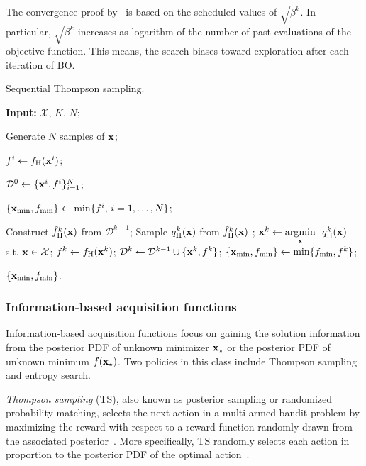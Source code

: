 \documentclass[journal ]{new-aiaa}
\begin{document}
The convergence proof by~\citet{Srinivas2010} is based on the scheduled values of $\sqrt{\beta^k}$.
In particular, $\sqrt{\beta^k}$ increases as logarithm of the number of past evaluations of the objective function.
This means, the search biases toward exploration after each iteration of BO.

\begin{algorithm}
	\caption{Sequential Thompson sampling.}\label{Algo2}
	\begin{algorithmic}[1]
		\State \textbf{Input:} $\mathcal{X}$, $K$, $N$;
		
		\State Generate $N$ samples of ${\bf x}$;
		
		\State $f^i \gets f_\text{H}({\bf x}^i)$; \textcolor{black}{}
		\EndFor
		
		\State $\mathcal{D}^0 \gets \{{\bf x}^i,f^i\}_{i=1}^N$;
		
		\State $\{{\bf x}_{\min},f_{\min}\} \gets \min\{f^i,\, i=1,\dots, N\}$;
		
		\State Construct $\hat{f}_\text{H}^k({\bf x})$ from $\mathcal{D}^{k-1}$;
		\State Sample $q_\text{H}^k({\bf x})$ from $\hat{f}_\text{H}^k({\bf x})$ \label{Algo2:10}; 
		\State ${\bf x}^{k} \gets \underset{{\bf x}}{\mathrm{argmin}} \ \ q_\text{H}^k({\bf x})$ s.t. ${\bf x} \in \mathcal{X}$;
		\State $f^{k} \gets f_\text{H}({\bf x}^{k})$;
		\textcolor{black}{}
		\State $\mathcal{D}^k\gets\mathcal{D}^{k-1} \cup \{{\bf x}^{k},f^{k}\}$;
		\State $\{{\bf x}_{\min},f_{\min}\} \gets \min\{f_{\min},f^{k}\}$;
		\EndFor
		
		\State \Return $\{{\bf x}_{\min},f_{\min}\}$.
	\end{algorithmic}
\end{algorithm}

\subsubsection{Information-based acquisition functions}\label{Sec513}

Information-based acquisition functions focus on gaining the solution information from the posterior PDF of unknown minimizer ${\bf x}_\star$ or the posterior PDF of unknown minimum $f({\bf x}_\star)$.
Two policies in this class include Thompson sampling and entropy search.

\textit{Thompson sampling} (TS), also known as posterior sampling or randomized probability matching, selects the next action in a multi-armed bandit problem by maximizing the reward with respect to a reward function randomly drawn from the associated posterior~\citep[see e.g.,][]{Chapelle2011,Agrawal2012,Bijl2016}.
More specifically, TS randomly selects each action in proportion to the posterior PDF of the optimal action~\citep{Scott2010}.
\end{document}
